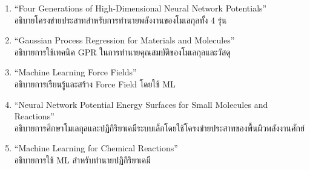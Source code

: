 \begin{enumerate}[topsep=0pt,noitemsep]
    \item \enquote{Four Generations of High-Dimensional Neural Network Potentials}\autocite{behler2021} \\
    อธิบายโครงข่ายประสาทสำหรับการทำนายพลังงานของโมเลกุลทั้ง 4 รุ่น

    \item \enquote{Gaussian Process Regression for Materials and Molecules}\autocite{deringer2021} \\
    อธิบายการใช้เทคนิค GPR ในการทำนายคุณสมบัติของโมเลกุลและวัสดุ

    \item \enquote{Machine Learning Force Fields}\autocite{unke2021} \\
    อธิบายการเรียนรู้และสร้าง Force Field โดยใช้ ML

    \item \enquote{Neural Network Potential Energy Surfaces for Small Molecules and Reactions}\autocite{manzhos2021} \\
    อธิบายการศึกษาโมเลกุลและปฏิกิริยาเคมีระบบเล็กโดยใช้โครงข่ายประสาทของพื้นผิวพลังงานศักย์

    \item \enquote{Machine Learning for Chemical Reactions}\autocite{meuwly2021} \\
    อธิบายการใช้ ML สำหรับทำนายปฏิกิริยาเคมี
\end{enumerate}
